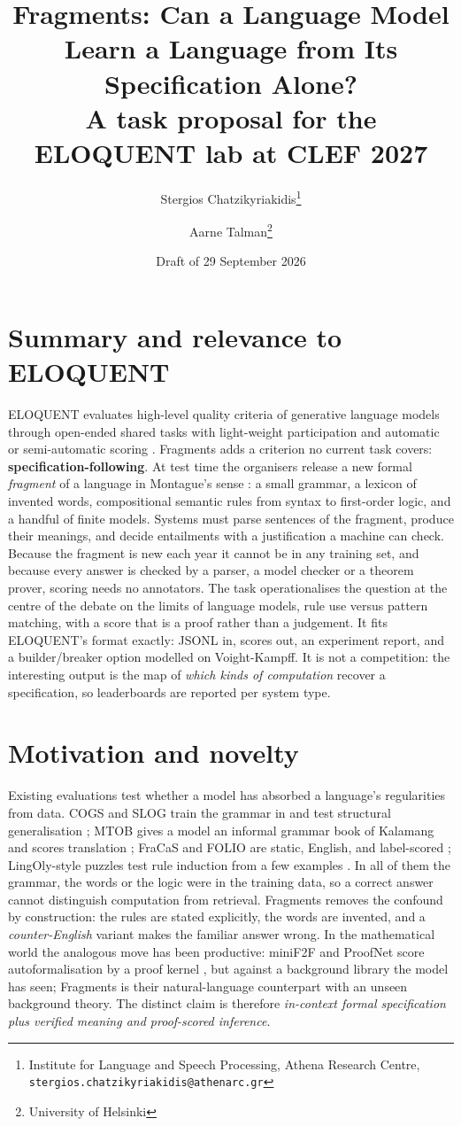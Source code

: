 \documentclass[10pt,a4paper]{article}
\title{\textbf{Fragments}: Can a Language Model Learn a Language from Its Specification Alone?\\[3pt]
\large A task proposal for the ELOQUENT lab at CLEF 2027}
\author{Stergios Chatzikyriakidis\thanks{Institute for Language and Speech Processing, Athena Research Centre, \texttt{stergios.chatzikyriakidis@athenarc.gr}}
\and Aarne Talman\thanks{University of Helsinki}}
\date{\vspace{-4pt}Draft of 29 September 2026}
\begin{document}
\maketitle

\section{Summary and relevance to ELOQUENT}
ELOQUENT evaluates high-level quality criteria of generative language models through open-ended shared tasks with light-weight participation and automatic or semi-automatic scoring \citep{karlgren2024eloquent,karlgren2025eloquent}. Fragments adds a criterion no current task covers: \textbf{specification-following}. At test time the organisers release a new formal \emph{fragment} of a language in Montague's sense \citep{montague1973}: a small grammar, a lexicon of invented words, compositional semantic rules from syntax to first-order logic, and a handful of finite models. Systems must parse sentences of the fragment, produce their meanings, and decide entailments with a justification a machine can check. Because the fragment is new each year it cannot be in any training set, and because every answer is checked by a parser, a model checker or a theorem prover, scoring needs no annotators. The task operationalises the question at the centre of the debate on the limits of language models, rule use versus pattern matching, with a score that is a proof rather than a judgement. It fits ELOQUENT's format exactly: JSONL in, scores out, an experiment report, and a builder/breaker option modelled on Voight-Kampff. It is not a competition: the interesting output is the map of \emph{which kinds of computation} recover a specification, so leaderboards are reported per system type.

\section{Motivation and novelty}
Existing evaluations test whether a model has absorbed a language's regularities from data. COGS and SLOG train the grammar in and test structural generalisation \citep{kim2020cogs,li2023slog}; MTOB gives a model an informal grammar book of Kalamang and scores translation \citep{tanzer2024mtob}; FraCaS and FOLIO are static, English, and label-scored \citep{cooper1996fracas,han2024folio}; LingOly-style puzzles test rule induction from a few examples \citep{bean2024lingoly}. In all of them the grammar, the words or the logic were in the training data, so a correct answer cannot distinguish computation from retrieval. Fragments removes the confound by construction: the rules are stated explicitly, the words are invented, and a \emph{counter-English} variant makes the familiar answer wrong. In the mathematical world the analogous move has been productive: miniF2F and ProofNet score autoformalisation by a proof kernel \citep{zheng2022minif2f,azerbayev2023proofnet}, but against a background library the model has seen; Fragments is their natural-language counterpart with an unseen background theory. The distinct claim is therefore \emph{in-context formal specification plus verified meaning and proof-scored inference}.
\end{document}
